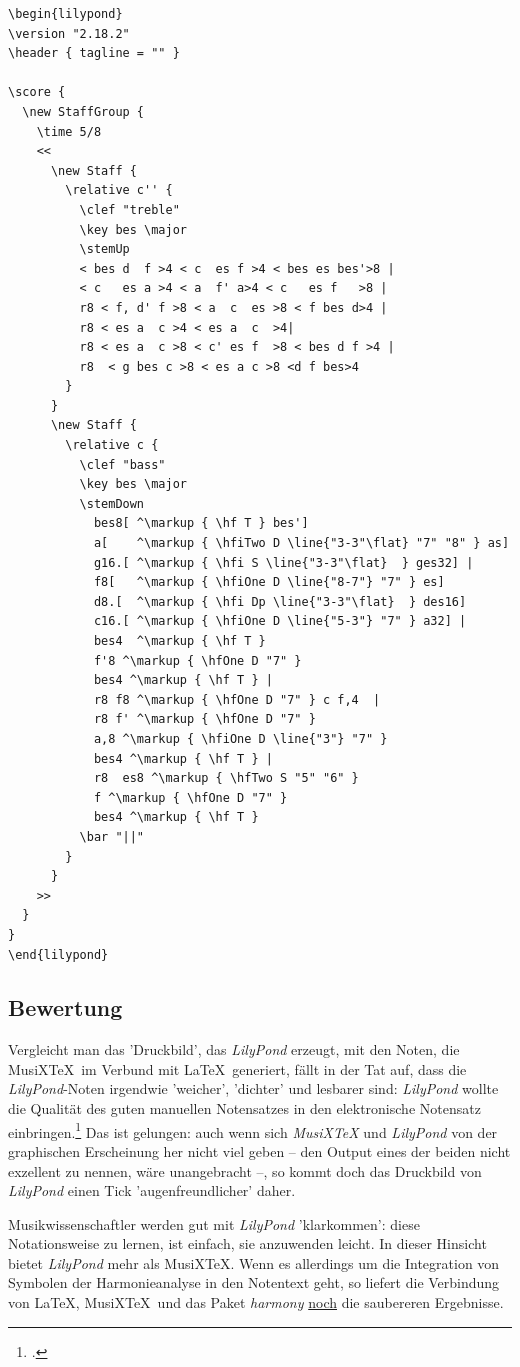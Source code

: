 \begin{verbatim}
\begin{lilypond}
\version "2.18.2"
\header { tagline = "" }

\score {
  \new StaffGroup {
    \time 5/8
    <<
      \new Staff {
        \relative c'' {
          \clef "treble"
          \key bes \major  
          \stemUp
          < bes d  f >4 < c  es f >4 < bes es bes'>8 |
          < c   es a >4 < a  f' a>4 < c   es f   >8 |         
          r8 < f, d' f >8 < a  c  es >8 < f bes d>4 |
          r8 < es a  c >4 < es a  c  >4|
          r8 < es a  c >8 < c' es f  >8 < bes d f >4 |
          r8  < g bes c >8 < es a c >8 <d f bes>4
        }   
      }
      \new Staff {
        \relative c { 
          \clef "bass"
          \key bes \major  
          \stemDown
            bes8[ ^\markup { \hf T } bes']
            a[    ^\markup { \hfiTwo D \line{"3-3"\flat} "7" "8" } as] 
            g16.[ ^\markup { \hfi S \line{"3-3"\flat}  } ges32] |
            f8[   ^\markup { \hfiOne D \line{"8-7"} "7" } es] 
            d8.[  ^\markup { \hfi Dp \line{"3-3"\flat}  } des16] 
            c16.[ ^\markup { \hfiOne D \line{"5-3"} "7" } a32] | 
            bes4  ^\markup { \hf T } 
            f'8 ^\markup { \hfOne D "7" } 
            bes4 ^\markup { \hf T } |
            r8 f8 ^\markup { \hfOne D "7" } c f,4  | 
            r8 f' ^\markup { \hfOne D "7" } 
            a,8 ^\markup { \hfiOne D \line{"3"} "7" } 
            bes4 ^\markup { \hf T } | 
            r8  es8 ^\markup { \hfTwo S "5" "6" } 
            f ^\markup { \hfOne D "7" } 
            bes4 ^\markup { \hf T }
          \bar "||"
        }   
      }
    >>
  }
}
\end{lilypond}
\end{verbatim}

\subsection{Bewertung}

Vergleicht man das 'Druckbild', das \textit{LilyPond} erzeugt, mit den Noten,
die MusiX\TeX\ im Verbund mit \LaTeX\ generiert, fällt in der Tat auf, dass die
\textit{LilyPond}-Noten irgendwie 'weicher', 'dichter' und lesbarer sind:
\textit{LilyPond} wollte die Qualität des guten manuellen Notensatzes in den
elektronische Notensatz einbringen.\footcite[vgl.][8ff]{LilyPond2018d} Das ist
gelungen: auch wenn sich \textit{MusiX\TeX} und \textit{LilyPond} von der
graphischen Erscheinung her nicht viel geben -- den Output eines der beiden
nicht exzellent zu nennen, wäre unangebracht --, so kommt doch das Druckbild von
\textit{LilyPond} einen Tick 'augenfreundlicher' daher.

Musikwissenschaftler werden gut mit \textit{LilyPond} 'klarkommen': diese
Notationsweise zu lernen, ist einfach, sie anzuwenden leicht. In dieser Hinsicht
bietet \textit{LilyPond} mehr als MusiX\TeX. Wenn es allerdings um die Integration
von Symbolen der Harmonieanalyse in den Notentext geht, so liefert die
Verbindung von \LaTeX, MusiX\TeX\ und das Paket \textit{harmony} \underline{noch} die
saubereren Ergebnisse.



%
